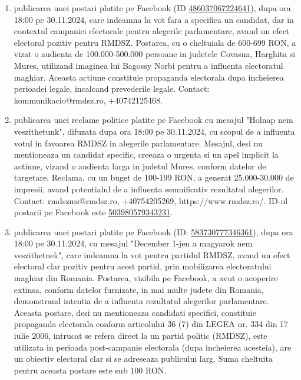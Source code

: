 \documentclass[a4paper,12pt]{article}
\begin{document}
\begin{enumerate}[leftmargin=*, label=\arabic*.)]
    \item publicarea unei postari platite pe Facebook (ID \href{https://www.facebook.com/ads/library/?id=486037067224641}{486037067224641}), dupa ora 18:00 pe 30.11.2024, care indeamna la vot fara a specifica un candidat, dar in contextul campaniei electorale pentru alegerile parlamentare, avand un efect electoral pozitiv pentru RMDSZ. Postarea, cu o cheltuiala de 600-699 RON, a vizat o audienta de 100.000-500.000 persoane in judetele Covasna, Harghita si Mures, utilizand imaginea lui Bagossy Norbi pentru a influenta electoratul maghiar.  Aceasta actiune constituie propaganda electorala dupa incheierea perioadei legale, incalcand prevederile legale.  Contact: kommunikacio@rmdsz.ro, +40742125468.
    \item publicarea unei reclame politice platite pe Facebook cu mesajul "Holnap nem veszithetunk", difuzata dupa ora 18:00 pe 30.11.2024, cu scopul de a influenta votul in favoarea RMDSZ in alegerile parlamentare.  Mesajul, desi nu mentioneaza un candidat specific, creeaza o urgenta si un apel implicit la actiune, vizand o audienta larga in judetul Mures, conform datelor de targetare.  Reclama, cu un buget de 100-199 RON, a generat 25.000-30.000 de impresii, avand potentialul de a influenta semnificativ rezultatul alegerilor.  Contact: rmdszms@rmdsz.ro, +40754205269, https://www.rmdsz.ro/. ID-ul postarii pe Facebook este \href{https://www.facebook.com/ads/library/?id=503980579343231}{503980579343231}.
    \item publicarea unei postari platite pe Facebook (ID: \href{https://www.facebook.com/ads/library/?id=583730777346361}{583730777346361}), dupa ora 18:00 pe 30.11.2024, cu mesajul "December 1-jen a magyarok nem veszithetnek", care indeamna la vot pentru partidul RMDSZ, avand un efect electoral clar pozitiv pentru acest partid, prin mobilizarea electoratului maghiar din Romania. Postarea, vizibila pe Facebook, a avut o acoperire extinsa, conform datelor furnizate, in mai multe judete din Romania, demonstrand intentia de a influenta rezultatul alegerilor parlamentare.  Aceasta postare, desi nu mentioneaza candidati specifici, constituie propaganda electorala conform articolului 36 (7) din LEGEA nr. 334 din 17 iulie 2006, intrucat se refera direct la un partid politic (RMDSZ), este utilizata in perioada post-campanie electorala (dupa incheierea acesteia), are un obiectiv electoral clar si se adreseaza publicului larg. Suma cheltuita pentru aceasta postare este sub 100 RON.
\end{enumerate}
\end{document}

